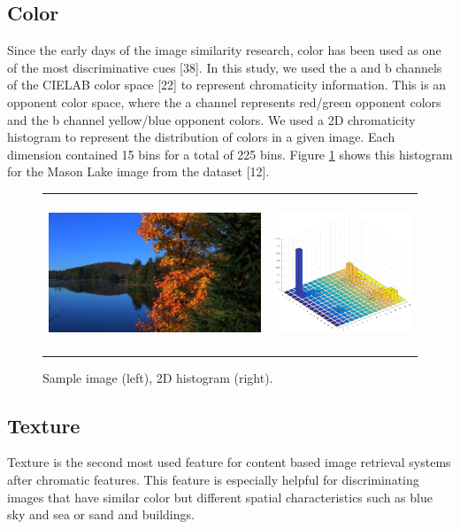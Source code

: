 \subsection{Color}
Since the early days of the image similarity research, color has been used as one of the most discriminative
cues [38]. In this study, we used the a and b channels of the CIELAB color space [22] to represent chromaticity information. This is an opponent color space, where the a channel represents red/green opponent colors and the b channel yellow/blue opponent colors. We used a 2D chromaticity histogram to represent the distribution of colors in a given image. Each dimension contained 15 bins for a total of 225 bins. Figure \ref{fig:hists} shows this histogram for the Mason Lake image from the dataset [12].

\begin{figure}
\centering
\caption{Sample image (left), 2D histogram (right).}
\label{fig:hists}
\begin{tabular}{c c}
\includegraphics[height=1.8in]{figures/chapter2/MasonLake.jpg} &
\includegraphics[height=1.8in]{figures/chapter2/57_histab.png}

\end{tabular}
\end{figure}

\subsection{Texture}
Texture is the second most used feature for content based image retrieval systems after chromatic features. This feature is especially helpful for discriminating images that have similar color but different spatial characteristics such as blue sky and sea or sand and buildings.

